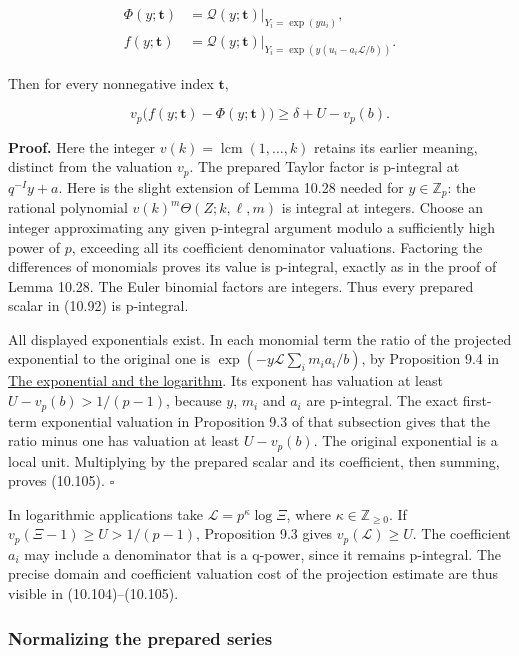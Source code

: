 \documentclass[
  11pt,
  a4paper,
]{article}
\begin{document}
\[
\begin{aligned}
\Phi(y;\boldsymbol t)&=\mathcal Q(y;\boldsymbol t)
\big|_{Y_i=\exp(yu_i)},\\
f(y;\boldsymbol t)&=\mathcal Q(y;\boldsymbol t)
\big|_{Y_i=\exp(y(u_i-a_i\mathcal L/b))}.
\end{aligned}
\tag{10.104}
\]

Then for every nonnegative index \(\boldsymbol t\),

\[
v_p\bigl(f(y;\boldsymbol t)-\Phi(y;\boldsymbol t)\bigr)
\ge\delta+U-v_p(b).
\tag{10.105}
\]

\textbf{Proof.} Here the integer \(v(k)=\operatorname{lcm}(1,\ldots,k)\)
retains its earlier meaning, distinct from the valuation \(v_p\). The
prepared Taylor factor is p-integral at \(q^{-I}y+a\). Here is the
slight extension of Lemma 10.28 needed for \(y\in\mathbb Z_p\): the
rational polynomial \(v(k)^m\Theta(Z;k,\ell,m)\) is integral at
integers. Choose an integer approximating any given p-integral argument
modulo a sufficiently high power of \(p\), exceeding all its coefficient
denominator valuations. Factoring the differences of monomials proves
its value is p-integral, exactly as in the proof of Lemma 10.28. The
Euler binomial factors are integers. Thus every prepared scalar in
(10.92) is p-integral.

All displayed exponentials exist. In each monomial term the ratio of the
projected exponential to the original one is
\(\exp(-y\mathcal L\sum_i m_i a_i/b)\), by Proposition 9.4 in
\href{../TR-BAKER-09.html\#3-the-exponential-and-the-logarithm}{The
exponential and the logarithm}. Its exponent has valuation at least
\(U-v_p(b)>1/(p-1)\), because \(y\), \(m_i\) and \(a_i\) are p-integral.
The exact first-term exponential valuation in Proposition 9.3 of that
subsection gives that the ratio minus one has valuation at least
\(U-v_p(b)\). The original exponential is a local unit. Multiplying by
the prepared scalar and its coefficient, then summing, proves (10.105).
\(\square\)

In logarithmic applications take \(\mathcal L=p^\kappa\log\Xi\), where
\(\kappa\in\mathbb Z_{\ge0}\). If \(v_p(\Xi-1)\ge U>1/(p-1)\),
Proposition 9.3 gives \(v_p(\mathcal L)\ge U\). The coefficient \(a_i\)
may include a denominator that is a q-power, since it remains
p-integral. The precise domain and coefficient valuation cost of the
projection estimate are thus visible in (10.104)--(10.105).

\subsubsection{Normalizing the prepared
series}\label{normalizing-the-prepared-series}
\end{document}
